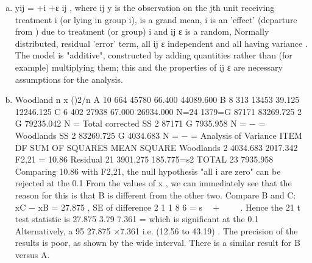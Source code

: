 \documentclass[a4paper,12pt]{article}
\begin{document}

\begin{enumerate}[(a)]
\item  yij = \mu +\alpha i +ε ij , where ij y is the observation on the jth unit receiving
treatment i (or lying in group i), \mu is a grand mean, i
\alpha  is an 'effect' (departure from
\mu ) due to treatment (or group) i and ij ε is a random, Normally distributed, residual
'error' term, all { } ij ε independent and all having variance  .
The model is "additive", constructed by adding quantities rather than (for example)
multiplying them; this and the properties of { } ij ε are necessary assumptions for the
analysis.
\item
Woodland n \sigmax {} x (\sigmax)2/n
A 10 664 45780 66.400 44089.600
B 8 313 13453 39.125 12246.125
C 6 402 27938 67.000 26934.000
N=24 1379=G 87171 83269.725
2
G 79235.042
N
=
Total corrected SS
2
87171 G 7935.958
N
= − =
Woodlands SS
2
83269.725 G 4034.683
N
= − =
Analysis of Variance
ITEM DF SUM OF SQUARES MEAN SQUARE
Woodlands 2 4034.683 2017.342 F2,21 = 10.86
Residual 21 3901.275 185.775=s2
TOTAL 23 7935.958
Comparing 10.86 with F2,21, the null hypothesis "all i
\alpha  are zero" can be rejected at
the 0.1%
From the values of x , we can immediately see that the reason for this is that B is
different from the other two.
Compare B and C:
xC − xB = 27.875 , SE of difference 2 1 1
8 6
= s  + 
 
.
Hence the 21 t test statistic is 27.875 3.79
7.361
= which is significant at the 0.1%
Alternatively, a 95%
27.875 ×7.361 i.e. (12.56 to 43.19) .
The precision of the results is poor, as shown by the wide interval.
There is a similar result for B versus A.
\end{enumerate}
\end{document}
